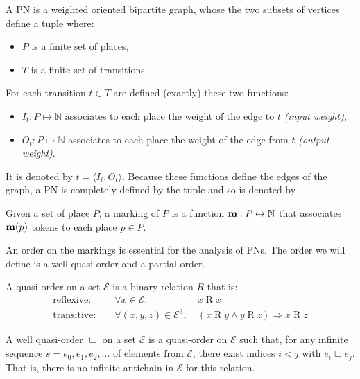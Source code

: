 \begin{defi}[\acl{PN}]
  A \acf{PN} \PN is a weighted oriented bipartite graph, whose the two subsets of vertices define a tuple \PT where:
  \begin{itemize}
    \item $P$ is a finite set of places,
    \item $T$ is a finite set of transitions.
  \end{itemize}
  For each transition $t \in T$ are defined (exactly) these two functions:
  \begin{itemize}
    \item $I_t : P \mapsto \mathbb{N}$ associates to each place the weight of the edge to $t$ \emph{(input weight)},
    \item $O_t : P \mapsto \mathbb{N}$ associates to each place the weight of the edge from $t$ \emph{(output weight)}.
  \end{itemize}
  It is denoted by $t = \langle I_t, O_t \rangle$.
  Because these functions define the edges of the graph, a \ac{PN} is completely defined by the tuple \PT and so is denoted by \NPT.
\end{defi}

\begin{defi}[marking]
  Given a set of place $P$, a marking of $P$ is a function $\mathbf{m} : P \mapsto \mathbb{N}$ that associates $\mathbf{m}(p)$ tokens to each place $p \in P$.
\end{defi}

An order on the markings is essential for the analysis of \acp{PN}. The order we will define is a well quasi-order and a partial order.

\begin{defi}
  A quasi-order on a set $\mathcal{E}$ is a binary relation $R$ that is:
  \begin{align*}
    \text{reflexive: } &&\forall x \in \mathcal{E},\ & x \mathrel{R} x \\
    \text{transitive: } &&\forall (x, y, z) \in \mathcal{E}^3,\ & (x \mathrel{R} y\land y \mathrel{R} z)\Rightarrow x \mathrel{R} z
  \end{align*}
\end{defi}

\begin{defi}
  A well quasi-order $\sqsubseteq$ on a set $\mathcal{E}$ is a quasi-order on $\mathcal{E}$ such that, for any infinite sequence $s = e_0, e_1, e_2, \dots$ of elements from $\mathcal{E}$, there exist indices $i < j$ with $e_i \sqsubseteq e_j$. That is, there is no infinite antichain in $\mathcal{E}$ for this relation.
\end{defi}

